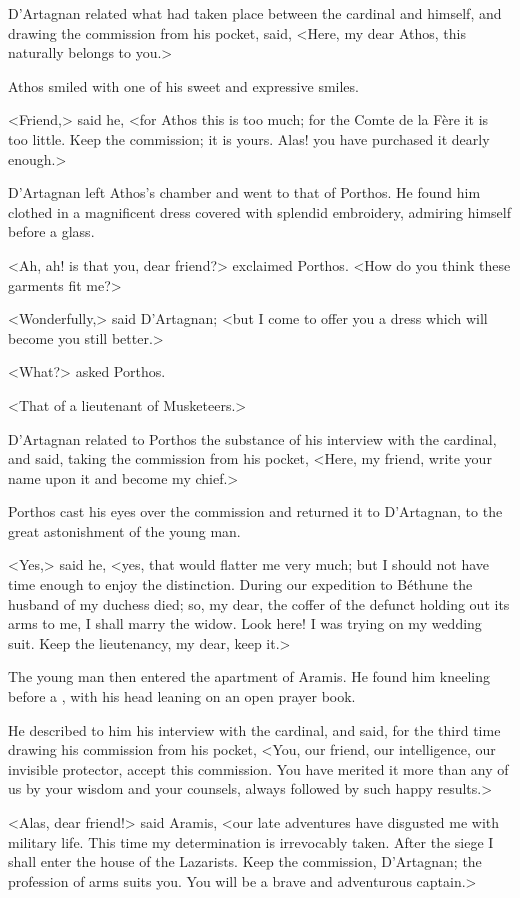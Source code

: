 D'Artagnan related what had taken place between the cardinal and himself, and drawing the commission from his pocket, said, <Here, my dear Athos, this naturally belongs to you.> 

Athos smiled with one of his sweet and expressive smiles. 

<Friend,> said he, <for Athos this is too much; for the Comte de la Fère it is too little. Keep the commission; it is yours. Alas! you have purchased it dearly enough.> 

D'Artagnan left Athos's chamber and went to that of Porthos. He found him clothed in a magnificent dress covered with splendid embroidery, admiring himself before a glass. 

<Ah, ah! is that you, dear friend?> exclaimed Porthos. <How do you think these garments fit me?> 

<Wonderfully,> said D'Artagnan; <but I come to offer you a dress which will become you still better.> 

<What?> asked Porthos. 

<That of a lieutenant of Musketeers.> 

D'Artagnan related to Porthos the substance of his interview with the cardinal, and said, taking the commission from his pocket, <Here, my friend, write your name upon it and become my chief.> 

Porthos cast his eyes over the commission and returned it to D'Artagnan, to the great astonishment of the young man. 

<Yes,> said he, <yes, that would flatter me very much; but I should not have time enough to enjoy the distinction. During our expedition to Béthune the husband of my duchess died; so, my dear, the coffer of the defunct holding out its arms to me, I shall marry the widow. Look here! I was trying on my wedding suit. Keep the lieutenancy, my dear, keep it.> 

The young man then entered the apartment of Aramis. He found him kneeling before a , with his head leaning on an open prayer book. 

He described to him his interview with the cardinal, and said, for the third time drawing his commission from his pocket, <You, our friend, our intelligence, our invisible protector, accept this commission. You have merited it more than any of us by your wisdom and your counsels, always followed by such happy results.> 

<Alas, dear friend!> said Aramis, <our late adventures have disgusted me with military life. This time my determination is irrevocably taken. After the siege I shall enter the house of the Lazarists. Keep the commission, D'Artagnan; the profession of arms suits you. You will be a brave and adventurous captain.> 

